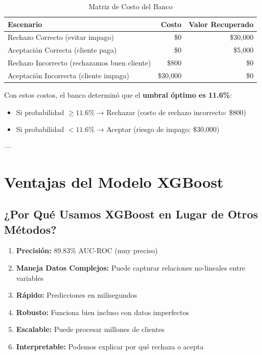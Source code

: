 \documentclass[11pt,a4paper,spanish]{article}
\begin{document}
\begin{table}[H]
\centering
\begin{tabular}{|l|r|r|}
\hline
\textbf{Escenario} & \textbf{Costo} & \textbf{Valor Recuperado} \\
\hline
Rechazo Correcto (evitar impago) & \$0 & \$30,000 \\
Aceptación Correcta (cliente paga) & \$0 & \$5,000 \\
Rechazo Incorrecto (rechazamos buen cliente) & \$800 & \$0 \\
Aceptación Incorrecta (cliente impaga) & \$30,000 & \$0 \\
\hline
\end{tabular}
\caption{Matriz de Costo del Banco}
\end{table}

Con estos costos, el banco determinó que el \textbf{umbral óptimo es 11.6\%}:

\begin{itemize}
    \item Si probabilidad $\geq 11.6\%$ → Rechazar (costo de rechazo incorrecto: \$800)
    \item Si probabilidad $< 11.6\%$ → Aceptar (riesgo de impago: \$30,000)
\end{itemize}

---

\section{Ventajas del Modelo XGBoost}

\subsection{¿Por Qué Usamos XGBoost en Lugar de Otros Métodos?}

\begin{enumerate}
    \item \textbf{Precisión:} 89.83\% AUC-ROC (muy preciso)
    
    \item \textbf{Maneja Datos Complejos:} Puede capturar relaciones no-lineales entre variables
    
    \item \textbf{Rápido:} Predicciones en milisegundos
    
    \item \textbf{Robusto:} Funciona bien incluso con datos imperfectos
    
    \item \textbf{Escalable:} Puede procesar millones de clientes
    
    \item \textbf{Interpretable:} Podemos explicar por qué rechaza o acepta
\end{enumerate}
\end{document}
